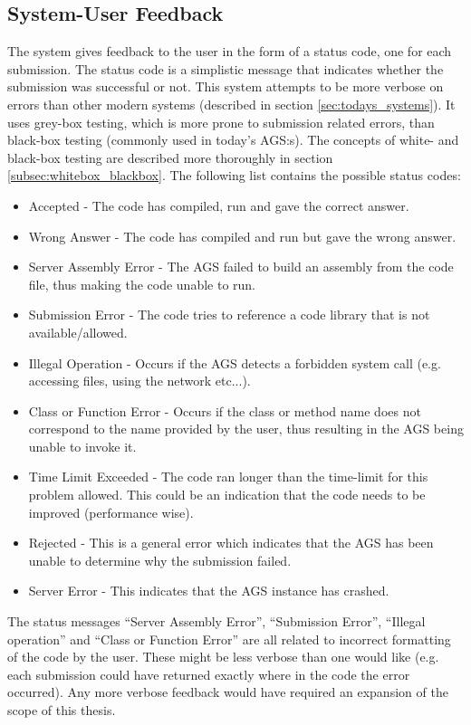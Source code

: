 \subsection{System-User Feedback} \label{subsec:status_codes}
The system gives feedback to the user in the form of a status code, one for each submission. The status code is a simplistic message that indicates whether the submission was successful or not. This system attempts to be more verbose on errors than other modern systems (described in section \ref{sec:todays_systems}). It uses grey-box testing, which is more prone to submission related errors, than black-box testing (commonly used in today's AGS:s). The concepts of white- and black-box testing are described more thoroughly in section \ref{subsec:whitebox_blackbox}. The following list contains the possible status codes:

\begin{itemize}
	\item Accepted - The code has compiled, run and gave the correct answer.
	\item Wrong Answer - The code has compiled and run but gave the wrong answer.
	\item Server Assembly Error - The AGS failed to build an assembly from the code file, thus making the code unable to run.
	\item Submission Error - The code tries to reference a code library that is not available/allowed. 
	\item Illegal Operation - Occurs if the AGS detects a forbidden system call (e.g. accessing files, using the network etc...).
	\item Class or Function Error - Occurs if the class or method name does not correspond to the name provided by the user, thus resulting in the AGS being unable to invoke it.
	\item Time Limit Exceeded - The code ran longer than the time-limit for this problem allowed. This could be an indication that the code needs to be improved (performance wise).
	\item Rejected - This is a general error which indicates that the AGS has been unable to determine why the submission failed. 
	\item Server Error - This indicates that the AGS instance has crashed.
\end{itemize}

The status messages ``Server Assembly Error'', ``Submission Error'', ``Illegal operation'' and ``Class or Function Error'' are all related to incorrect formatting of the code by the user. These might be less verbose than one would like (e.g. each submission could have returned exactly where in the code the error occurred). Any more verbose feedback would have required an expansion of the scope of this thesis.

